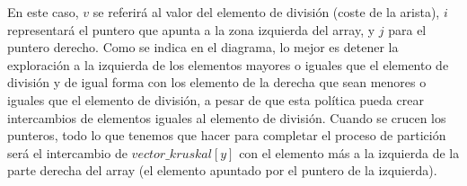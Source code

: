 En este caso, $v$ se referirá al valor del elemento de división (coste de la arista), $i$ representará el puntero que apunta a la zona izquierda del array, y $j$ para el puntero derecho. Como se indica en el diagrama, lo mejor es detener la exploración a la izquierda de los elementos mayores o iguales que el elemento de división y de igual forma con los elemento de la derecha que sean menores o iguales que el elemento de división, a pesar de que esta política pueda crear intercambios de elementos iguales al elemento de división. Cuando se crucen los punteros, todo lo que tenemos que hacer para completar el proceso de partición será el intercambio de $vector\_kruskal[y]$ con el elemento más a la izquierda de la parte derecha del array (el elemento apuntado por el puntero de la izquierda).\\


